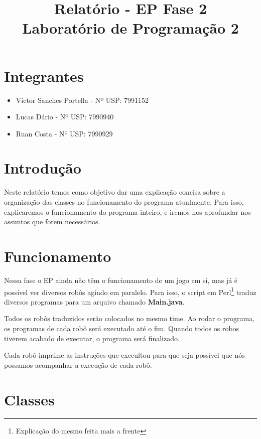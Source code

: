 \documentclass[11pt]{article}
\title{Relatório - EP Fase 2 \\ Laboratório de Programação 2}
\begin{document}
\maketitle

\section{Integrantes}

\begin{itemize}

\item Victor Sanches Portella - Nº USP: 7991152

\item Lucas Dário - Nº USP: 7990940

\item Ruan Costa - Nº USP: 7990929

\end{itemize}

\section{Introdução}

Neste relatório temos como objetivo dar uma explicação concisa sobre a organização das classes no funcionamento do programa atualmente. Para isso, explicaremos o funcionamento do programa inteiro, e iremos nos aprofundar nos assuntos que forem necessários.


\section{Funcionamento}

Nessa fase o EP ainda não têm o funcionamento de um jogo em si, mas já é possível ver diversos robôs agindo em paralelo. Para isso, o script em Perl\footnote{Explicação do mesmo feita mais a frente} traduz diversos programas para um arquivo chamado \textbf{\color{red}Main.java}. 

Todos os robôs traduzidos serão colocados no mesmo time. Ao rodar o programa, os programas de cada robô será executado até o fim. Quando todos os robos tiverem acabado de executar, o programa será finalizado.

Cada robô imprime as instruções que execultou para que seja possível que nós possamos acompanhar a execução de cada robô.

\section{Classes}
\end{document}
